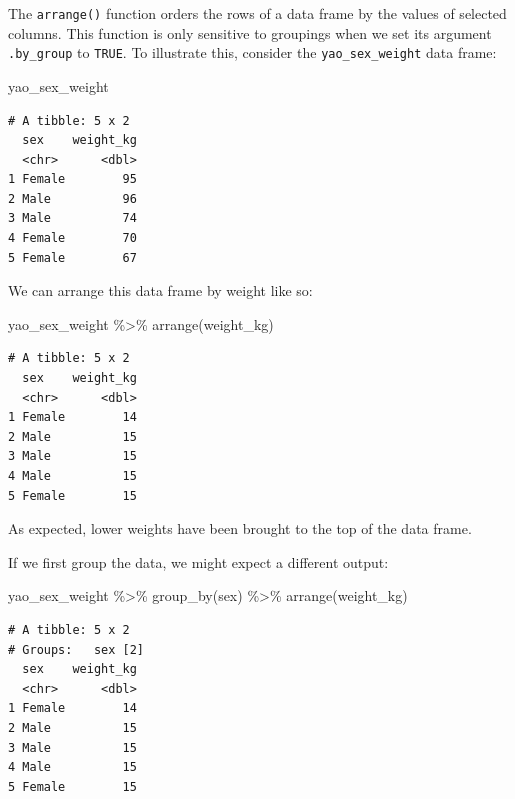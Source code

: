 \documentclass[
  letterpaper,
  DIV=11,
  numbers=noendperiod]{scrreprt}
\newenvironment{Shaded}{\begin{snugshade}}{\end{snugshade}}
\newcommand{\FunctionTok}[1]{\textcolor[rgb]{0.28,0.35,0.67}{#1}}
\newcommand{\NormalTok}[1]{\textcolor[rgb]{0.00,0.23,0.31}{#1}}
\newcommand{\SpecialCharTok}[1]{\textcolor[rgb]{0.37,0.37,0.37}{#1}}
\begin{document}
The \texttt{arrange()} function orders the rows of a data frame by the
values of selected columns. This function is only sensitive to groupings
when we set its argument \texttt{.by\_group} to \texttt{TRUE}. To
illustrate this, consider the \texttt{yao\_sex\_weight} data frame:

\begin{Shaded}
\begin{Highlighting}[]
\NormalTok{yao\_sex\_weight}
\end{Highlighting}
\end{Shaded}

\begin{verbatim}
# A tibble: 5 x 2
  sex    weight_kg
  <chr>      <dbl>
1 Female        95
2 Male          96
3 Male          74
4 Female        70
5 Female        67
\end{verbatim}

We can arrange this data frame by weight like so:

\begin{Shaded}
\begin{Highlighting}[]
\NormalTok{yao\_sex\_weight }\SpecialCharTok{\%\textgreater{}\%} 
  \FunctionTok{arrange}\NormalTok{(weight\_kg)}
\end{Highlighting}
\end{Shaded}

\begin{verbatim}
# A tibble: 5 x 2
  sex    weight_kg
  <chr>      <dbl>
1 Female        14
2 Male          15
3 Male          15
4 Male          15
5 Female        15
\end{verbatim}

As expected, lower weights have been brought to the top of the data
frame.

If we first group the data, we might expect a different output:

\begin{Shaded}
\begin{Highlighting}[]
\NormalTok{yao\_sex\_weight }\SpecialCharTok{\%\textgreater{}\%} 
  \FunctionTok{group\_by}\NormalTok{(sex) }\SpecialCharTok{\%\textgreater{}\%} 
  \FunctionTok{arrange}\NormalTok{(weight\_kg)}
\end{Highlighting}
\end{Shaded}

\begin{verbatim}
# A tibble: 5 x 2
# Groups:   sex [2]
  sex    weight_kg
  <chr>      <dbl>
1 Female        14
2 Male          15
3 Male          15
4 Male          15
5 Female        15
\end{verbatim}
\end{document}

